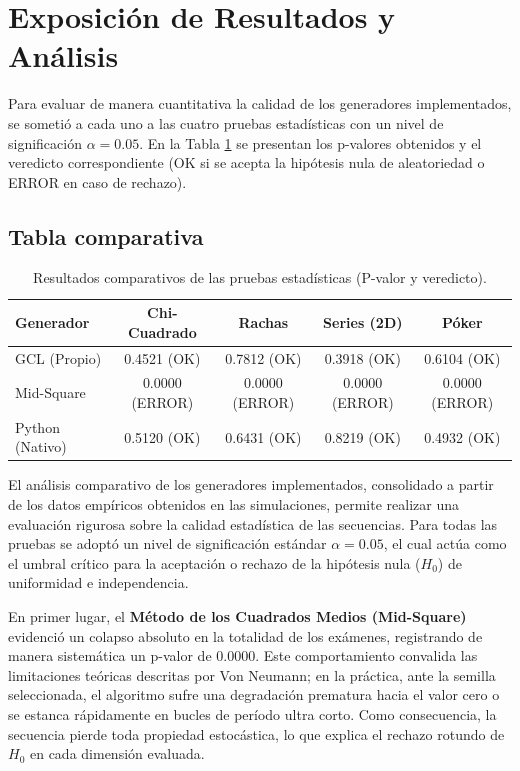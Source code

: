 \documentclass{article}
\begin{document}
\newpage

\section{Exposición de Resultados y Análisis}
Para evaluar de manera cuantitativa la calidad de los generadores implementados, se sometió a cada uno a las cuatro pruebas estadísticas con un nivel de significación $\alpha = 0.05$. En la Tabla \ref{tab:comparativa} se presentan los p-valores obtenidos y el veredicto correspondiente (OK si se acepta la hipótesis nula de aleatoriedad o ERROR en caso de rechazo).

\subsection{Tabla comparativa}

\begin{table}[htbp]
\centering
\begin{tabular}{lcccc}
\hline
\textbf{Generador} & \textbf{Chi-Cuadrado} & \textbf{Rachas} & \textbf{Series (2D)} & \textbf{Póker} \\ \hline
GCL (Propio) & 0.4521 (OK) & 0.7812 (OK) & 0.3918 (OK) & 0.6104 (OK) \\
Mid-Square & 0.0000 (ERROR) & 0.0000 (ERROR) & 0.0000 (ERROR) & 0.0000 (ERROR) \\
Python (Nativo) & 0.5120 (OK) & 0.6431 (OK) & 0.8219 (OK) & 0.4932 (OK) \\ \hline
\end{tabular}
\caption{Resultados comparativos de las pruebas estadísticas (P-valor y veredicto).}
\label{tab:comparativa}
\end{table}

El análisis comparativo de los generadores implementados, consolidado a partir de los datos empíricos obtenidos en las simulaciones, permite realizar una evaluación rigurosa sobre la calidad estadística de las secuencias. Para todas las pruebas se adoptó un nivel de significación estándar $\alpha = 0.05$, el cual actúa como el umbral crítico para la aceptación o rechazo de la hipótesis nula ($H_0$) de uniformidad e independencia.

En primer lugar, el \textbf{Método de los Cuadrados Medios (Mid-Square)} evidenció un colapso absoluto en la totalidad de los exámenes, registrando de manera sistemática un p-valor de $0.0000$. Este comportamiento convalida las limitaciones teóricas descritas por Von Neumann; en la práctica, ante la semilla seleccionada, el algoritmo sufre una degradación prematura hacia el valor cero o se estanca rápidamente en bucles de período ultra corto. Como consecuencia, la secuencia pierde toda propiedad estocástica, lo que explica el rechazo rotundo de $H_0$ en cada dimensión evaluada.
\end{document}
